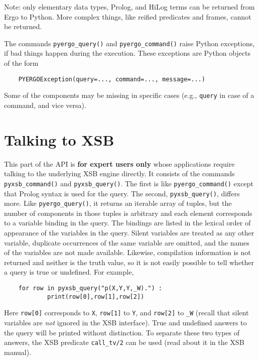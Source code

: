Note: only elementary data types, Prolog, and HiLog terms can be returned
from Ergo to Python. More complex things, like reified predicates and
frames, cannot be returned.

The commands \texttt{pyergo\_query()} and
\texttt{pyergo\_command()} raise Python exceptions, if bad things happen
during the execution. These exceptions are Python objects of the form
\begin{verbatim}
    PYERGOException(query=..., command=..., message=...)
\end{verbatim}
Some of the components may be missing in specific cases (e.g.,
\texttt{query} in case of a command, and vice versa).


\section{Talking to XSB}\label{sec-pyxsb-query}

This part of the 
API is \textbf{for expert users only} whose applications require talking to
the underlying XSB engine directly. It
consists of the commands  \texttt{pyxsb\_command()} and
\texttt{pyxsb\_query()}.
The first is like
\texttt{pyergo\_command()} except that Prolog syntax is used for the
query.  The second, \texttt{pyxsb\_query()}, differs more.  Like
\texttt{pyergo\_query()}, it returns an iterable array of tuples, but the
number of components in those tuples is arbitrary and each element
corresponds to a variable binding in the query. The bindings are listed in
the lexical order of appearance of the variables in the query.  Silent variables
are treated as any other variable, duplicate occurrences of the same
variable are omitted, and the names of the variables are not made
available.  Likewise, compilation information is not returned and neither
is the truth value, so it is not easily possible to tell whether a query is
true or undefined.
For example,
\begin{verbatim}
    for row in pyxsb_query("p(X,Y,Y,_W).") :
            print(row[0],row[1],row[2])
\end{verbatim}
Here \texttt{row[0]} corresponds to \texttt{X}, \texttt{row[1]}  
to \texttt{Y}, and \texttt{row[2]} to \texttt{\_W} (recall that silent
variables are \emph{not} ignored in the XSB interface).
True and undefined answers to the query will be printed without
distinction. To separate these two types of answers, the XSB predicate
\texttt{call\_tv/2} can be used (read about it in the XSB manual). 


